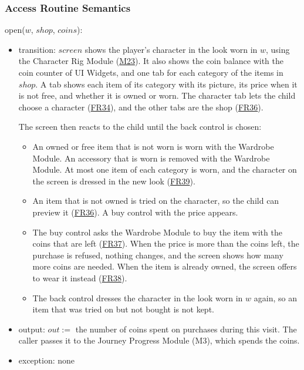 \documentclass[10pt, titlepage]{article}
\newcommand{\srsurl}{https://team-hindsight.github.io/ophthamology-game/SRS/SRS.pdf}
\newcommand{\srsitemref}[2]{\href{\srsurl\#nameddest=#1}{#2}}
\newcommand{\misref}[2]{\hyperref[mis:#1]{M#2}}
\newcommand{\T}[1]{\mathit{#1}}          %
\newcommand{\out}{\mathit{out}}
\begin{document}
\subsubsection{Access Routine Semantics}

\noindent open($w$, $\T{shop}$, $\T{coins}$):
\begin{itemize}
\item transition: $\T{screen}$ shows the player's character in the look worn
  in $w$, using the Character Rig Module (\misref{Rig}{23}). It also shows the
  coin balance with the coin counter of UI Widgets, and one tab for each
  category of the items in $\T{shop}$. A tab shows each item of its category
  with its picture, its price when it is not free, and whether it is owned or
  worn. The character tab lets the child choose a character
  (\srsitemref{FR_ChooseCharacter}{FR34}), and the other tabs are the shop
  (\srsitemref{FR_Shop}{FR36}).

  The screen then reacts to the child until the back control is chosen:
  \begin{itemize}
  \item An owned or free item that is not worn is worn with the Wardrobe
    Module. An accessory that is worn is removed with the Wardrobe Module. At
    most one item of each category is worn, and the character on the screen is
    dressed in the new look (\srsitemref{FR_Equip}{FR39}).
  \item An item that is not owned is tried on the character, so the child can
    preview it (\srsitemref{FR_Shop}{FR36}). A buy control with the price
    appears.
  \item The buy control asks the Wardrobe Module to buy the item with the
    coins that are left (\srsitemref{FR_Purchase}{FR37}). When the price is
    more than the coins left, the purchase is refused, nothing changes, and the
    screen shows how many more coins are needed. When the item is already
    owned, the screen offers to wear it instead
    (\srsitemref{FR_PurchaseRefused}{FR38}).
  \item The back control dresses the character in the look worn in $w$ again,
    so an item that was tried on but not bought is not kept.
  \end{itemize}
\item output: $\out :=$ the number of coins spent on purchases during this
  visit. The caller passes it to the Journey Progress Module (M3), which spends
  the coins.
\item exception: none
\end{itemize}
\end{document}
